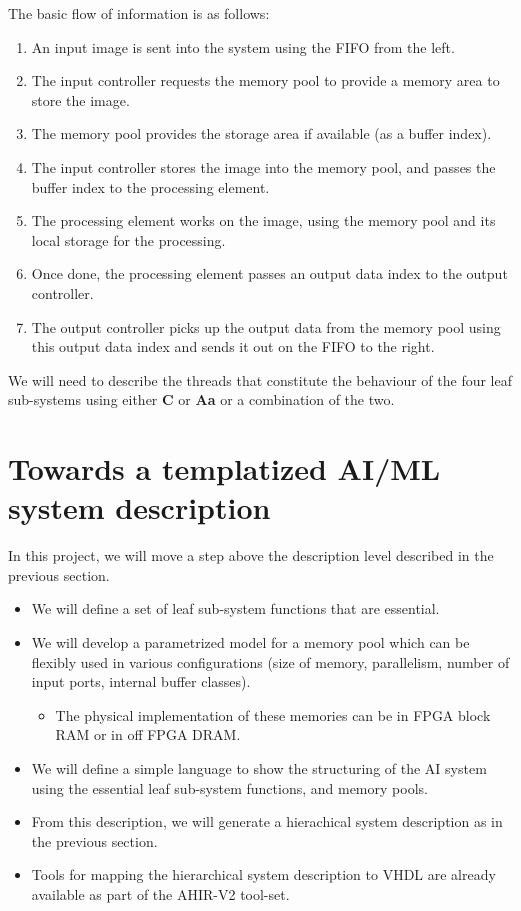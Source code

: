 \documentclass{article}
\begin{document}
The basic flow of information is as follows:
\begin{enumerate}
\item An input image is sent into the system using the FIFO from the left.
\item The input controller requests the memory pool to provide a memory
area to store the image.
\item The memory pool provides the storage area if available (as a buffer index).
\item The input controller stores the image into the memory pool, and
passes the buffer index to the processing element.
\item The processing element works on the image, using the memory pool and
its local storage for the processing.
\item Once done, the processing element passes an output data index to the
output controller.
\item The output controller picks up the output data from the memory pool
using this output data index and sends it out on the FIFO to the right.
\end{enumerate}

We will need to describe the threads that constitute the behaviour of
the four leaf sub-systems using either {\bf C} or {\bf Aa} or a combination
of the two.

\section{Towards a templatized AI/ML system description}

In this project, we will move a step above the description level described
in the previous section.
\begin{itemize}
\item We will define a set of leaf sub-system functions that are essential.
\item We will develop a parametrized model for a memory pool which can
be flexibly used in various configurations (size of memory, parallelism, number
of input ports, internal buffer classes).
\begin{itemize}
\item The physical implementation of these memories can be in FPGA block RAM
or in off FPGA DRAM.
\end{itemize}
\item We will define a simple language to show the structuring of the AI
system using the essential leaf sub-system functions, and memory pools.
\item From this description, we will generate a hierachical system description
as in the previous section.
\item Tools for mapping the hierarchical system description to VHDL 
are already available as part of the AHIR-V2 tool-set.
\end{itemize}
\end{document}
